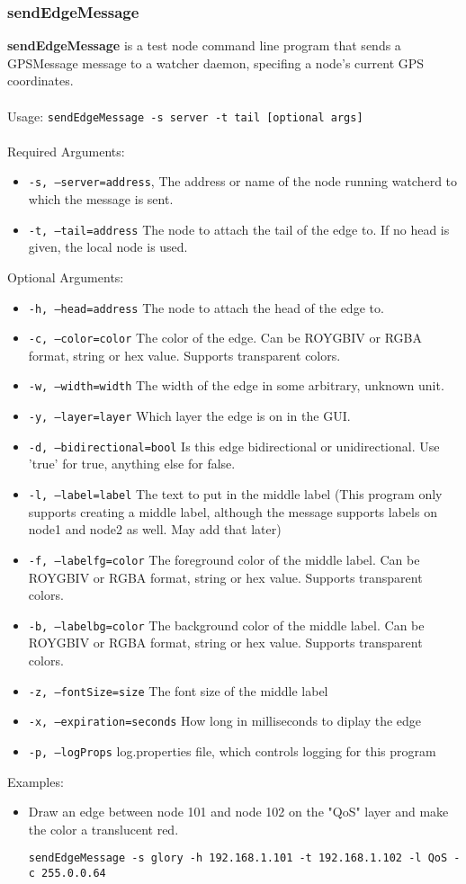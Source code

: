 \newpage
\label{sendEdgeMessage}
\subsubsection{sendEdgeMessage}

{\bf sendEdgeMessage} is a test node command line program that sends a GPSMessage message to a watcher daemon, specifing a node's current GPS coordinates.
\\\\
Usage: 
{\tt sendEdgeMessage -s server -t tail [optional args]}
\\\\
Required Arguments:
\begin{itemize}
\item {\tt -s, --server=address}, The address or name of the node running watcherd to which the message is sent.
\item {\tt -t, --tail=address}       The node to attach the tail of the edge to. If no head is given, the local node is used.
\end{itemize}
Optional Arguments:
\begin{itemize}
\item {\tt -h, --head=address}       The node to attach the head of the edge to.
\item {\tt -c, --color=color}        The color of the edge. Can be ROYGBIV or RGBA format, string or hex value. Supports transparent colors.
\item {\tt -w, --width=width}        The width of the edge in some arbitrary, unknown unit.
\item {\tt -y, --layer=layer}        Which layer the edge is on in the GUI.
\item {\tt -d, --bidirectional=bool} Is this edge bidirectional or unidirectional. Use 'true' for true, anything else for false.
\item {\tt -l, --label=label}        The text to put in the middle label (This program only supports creating a middle label, although the message supports labels on node1 and node2 as well. May add that later)
\item {\tt -f, --labelfg=color}      The foreground color of the middle label. Can be ROYGBIV or RGBA format, string or hex value. Supports transparent colors.
\item {\tt -b, --labelbg=color}      The background color of the middle label. Can be ROYGBIV or RGBA format, string or hex value. Supports transparent colors.
\item {\tt -z, --fontSize=size}      The font size of the middle label
\item {\tt -x, --expiration=seconds} How long in milliseconds to diplay the edge
\item {\tt -p, --logProps}           log.properties file, which controls logging for this program
\end{itemize}
Examples:
\begin{itemize}
\item Draw an edge between node 101 and node 102 on the "QoS" layer and make the color a translucent red.

{\tt sendEdgeMessage -s glory -h 192.168.1.101 -t 192.168.1.102 -l QoS -c 255.0.0.64}
\end{itemize}

